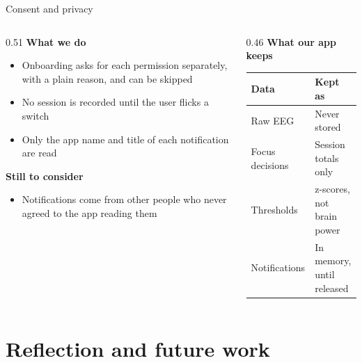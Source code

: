 \documentclass[aspectratio=169,11pt]{beamer}
\begin{document}
\begin{frame}{Consent and privacy}
  \begin{columns}[T]
    \begin{column}{0.51\textwidth}
      \small
      \textbf{What we do}
      \begin{itemize}
        \item Onboarding asks for each permission separately, with a plain reason, and can be skipped
        \item No session is recorded until the user flicks a switch
        \item Only the app name and title of each notification are read
      \end{itemize}

      \textbf{Still to consider}
      \begin{itemize}
        \item Notifications come from other people who never agreed to the app reading them
      \end{itemize}
    \end{column}

    \begin{column}{0.46\textwidth}
      \small
      \textbf{What our app keeps}

      \vspace{0.15cm}
      \begin{tabular}{@{}l l@{}}
        \toprule
        \textbf{Data} & \textbf{Kept as} \\
        \midrule
        Raw EEG          & Never stored \\
        Focus decisions  & Session totals only \\
        Thresholds       & z-scores, not brain power \\
        Notifications    & In memory, until released \\
        \bottomrule
      \end{tabular}
    \end{column}
  \end{columns}
\end{frame}

 

\section{Reflection and future work}
\end{document}
